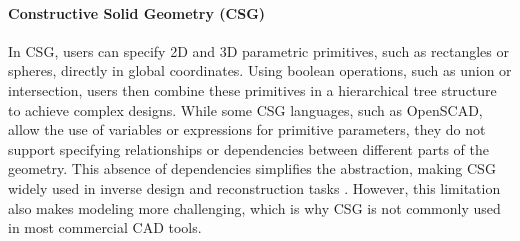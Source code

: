 
\paragraph{Constructive Solid Geometry (CSG)}
In CSG, users can specify 2D and 3D parametric primitives, such as rectangles or spheres, directly in global coordinates.
Using boolean operations, such as union or intersection, users then combine these primitives in a hierarchical tree structure to achieve complex designs.
While some CSG languages, such as OpenSCAD, allow the use of variables or expressions for primitive parameters, they do not support specifying relationships or dependencies between different parts of the geometry.
This absence of dependencies simplifies the abstraction, making CSG widely used in inverse design and reconstruction tasks \citep{du_inversecsg_2018, nandi2020synthesizing, yu2022capri, michel2021dag}. 
However, this limitation also makes modeling more challenging, which is why CSG is not commonly used in most commercial CAD tools.



